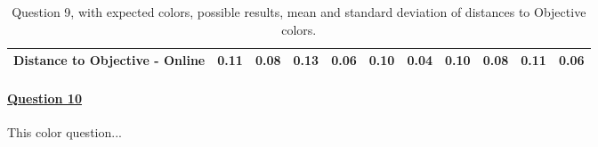 \begin{table}[H]
{\begin{tabular}{lccccccccccccc}
    \multicolumn{4}{l}{Distance to Objective - Online}                                                                                               & \multicolumn{1}{|c}{0.11}        & \multicolumn{1}{c|}{0.08}    & \multicolumn{1}{|c}{0.13}        & \multicolumn{1}{c|}{0.06}    & \multicolumn{1}{|c}{\textbf{0.10}}       & \multicolumn{1}{c|}{0.04}    & \multicolumn{1}{|c}{\textbf{0.10}}        & \multicolumn{1}{c|}{0.08}    & \multicolumn{1}{|c}{0.11}       & \multicolumn{1}{c|}{0.06}    \\ \hline
    \end{tabular}}
  \caption[Question 9, with expected Results.]{Question 9, with expected colors, possible results, mean and standard deviation of distances to Objective colors.}
  \label{table:lab_q9_expected}
\end{table}
%
\paragraph{\ul{Question 10}}
%
This color question...
%
